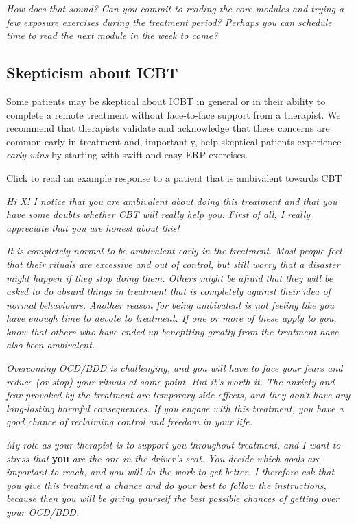 \documentclass[]{book}
\theoremstyle{definition}
\theoremstyle{definition}
\theoremstyle{definition}
\theoremstyle{remark}
\begin{document}
\emph{How does that sound? Can you commit to reading the core modules
and trying a few exposure exercises during the treatment period? Perhaps
you can schedule time to read the next module in the week to come?}

\hypertarget{skepticism-about-icbt}{%
\subsection{Skepticism about ICBT}\label{skepticism-about-icbt}}

Some patients may be skeptical about ICBT in general or in their ability
to complete a remote treatment without face-to-face support from a
therapist. We recommend that therapists validate and acknowledge that
these concerns are common early in treatment and, importantly, help
skeptical patients experience \emph{early wins} by starting with swift
and easy ERP exercises.

 Click to read an example response to a patient that is ambivalent
towards CBT

\emph{Hi X! I notice that you are ambivalent about doing this treatment
and that you have some doubts whether CBT will really help you. First of
all, I really appreciate that you are honest about this!}

\emph{It is completely normal to be ambivalent early in the treatment.
Most people feel that their rituals are excessive and out of control,
but still worry that a disaster might happen if they stop doing them.
Others might be afraid that they will be asked to do absurd things in
treatment that is completely against their idea of normal behaviours.
Another reason for being ambivalent is not feeling like you have enough
time to devote to treatment. If one or more of these apply to you, know
that others who have ended up benefitting greatly from the treatment
have also been ambivalent.}

\emph{Overcoming OCD/BDD is challenging, and you will have to face your
fears and reduce (or stop) your rituals at some point. But it's worth
it. The anxiety and fear provoked by the treatment are temporary side
effects, and they don't have any long-lasting harmful consequences. If
you engage with this treatment, you have a good chance of reclaiming
control and freedom in your life.}

\emph{My role as your therapist is to support you throughout treatment,
and I want to stress that} \textbf{you} \emph{are the one in the
driver's seat. You decide which goals are important to reach, and you
will do the work to get better. I therefore ask that you give this
treatment a chance and do your best to follow the instructions, because
then you will be giving yourself the best possible chances of getting
over your OCD/BDD.}
\end{document}
